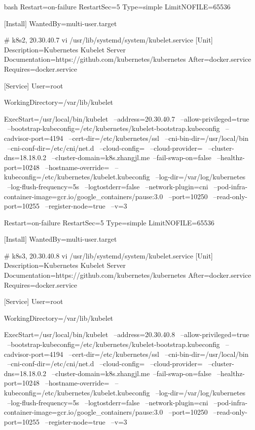 \begin{outline}[enumerate]
\begin{code-in-enumerate}{bash}
Restart=on-failure
RestartSec=5
Type=simple
LimitNOFILE=65536

[Install]
WantedBy=multi-user.target

# k8s2, 20.30.40.7
vi /usr/lib/systemd/system/kubelet.service
[Unit]
Description=Kubernetes Kubelet Server
Documentation=https://github.com/kubernetes/kubernetes
After=docker.service
Requires=docker.service

[Service]
User=root

WorkingDirectory=/var/lib/kubelet

ExecStart=/usr/local/bin/kubelet \
    --address=20.30.40.7 \
    --allow-privileged=true \
    --bootstrap-kubeconfig=/etc/kubernetes/kubelet-bootstrap.kubeconfig \
    --cadvisor-port=4194 \
    --cert-dir=/etc/kubernetes/ssl \
    --cni-bin-dir=/usr/local/bin \
    --cni-conf-dir=/etc/cni/net.d \
    --cloud-config= \
    --cloud-provider= \
    --cluster-dns=18.18.0.2 \
    --cluster-domain=k8s.zhangjl.me\
    --fail-swap-on=false \
    --healthz-port=10248 \
    --hostname-override= \
    --kubeconfig=/etc/kubernetes/kubelet.kubeconfig \
    --log-dir=/var/log/kubernetes \
    --log-flush-frequency=5s \
    --logtostderr=false \
    --network-plugin=cni \
    --pod-infra-container-image=gcr.io/google_containers/pause:3.0 \
    --port=10250 \
    --read-only-port=10255 \
    --register-node=true \
    --v=3

Restart=on-failure
RestartSec=5
Type=simple
LimitNOFILE=65536

[Install]
WantedBy=multi-user.target

# k8s3, 20.30.40.8
vi /usr/lib/systemd/system/kubelet.service
[Unit]
Description=Kubernetes Kubelet Server
Documentation=https://github.com/kubernetes/kubernetes
After=docker.service
Requires=docker.service

[Service]
User=root

WorkingDirectory=/var/lib/kubelet

ExecStart=/usr/local/bin/kubelet \
    --address=20.30.40.8 \
    --allow-privileged=true \
    --bootstrap-kubeconfig=/etc/kubernetes/kubelet-bootstrap.kubeconfig \
    --cadvisor-port=4194 \
    --cert-dir=/etc/kubernetes/ssl \
    --cni-bin-dir=/usr/local/bin \
    --cni-conf-dir=/etc/cni/net.d \
    --cloud-config= \
    --cloud-provider= \
    --cluster-dns=18.18.0.2 \
    --cluster-domain=k8s.zhangjl.me\
    --fail-swap-on=false \
    --healthz-port=10248 \
    --hostname-override= \
    --kubeconfig=/etc/kubernetes/kubelet.kubeconfig \
    --log-dir=/var/log/kubernetes \
    --log-flush-frequency=5s \
    --logtostderr=false \
    --network-plugin=cni \
    --pod-infra-container-image=gcr.io/google_containers/pause:3.0 \
    --port=10250 \
    --read-only-port=10255 \
    --register-node=true \
    --v=3


\end{code-in-enumerate}
\end{outline}
